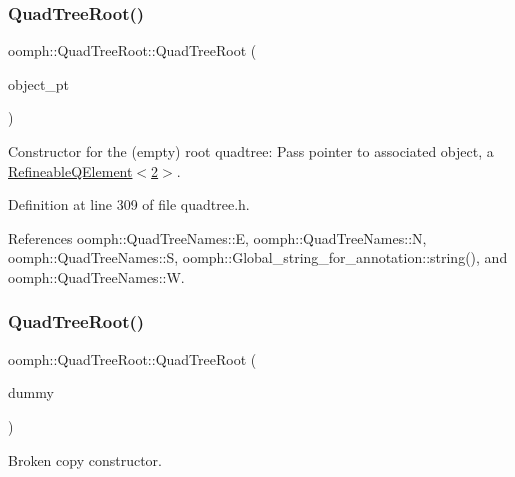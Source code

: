 \subsubsection{\texorpdfstring{Quad\+Tree\+Root()}{QuadTreeRoot()}\hspace{0.1cm}{\footnotesize\ttfamily [1/2]}}
{\footnotesize\ttfamily oomph\+::\+Quad\+Tree\+Root\+::\+Quad\+Tree\+Root (\begin{DoxyParamCaption}\item[{\hyperlink{classoomph_1_1RefineableElement}{Refineable\+Element} $\ast$const \&}]{object\+\_\+pt }\end{DoxyParamCaption})\hspace{0.3cm}{\ttfamily [inline]}}

Constructor for the (empty) root quadtree\+: Pass pointer to associated object, a \hyperlink{classoomph_1_1RefineableQElement_3_012_01_4}{Refineable\+Q\+Element$<$2$>$}. 

Definition at line 309 of file quadtree.\+h.



References oomph\+::\+Quad\+Tree\+Names\+::E, oomph\+::\+Quad\+Tree\+Names\+::N, oomph\+::\+Quad\+Tree\+Names\+::S, oomph\+::\+Global\+\_\+string\+\_\+for\+\_\+annotation\+::string(), and oomph\+::\+Quad\+Tree\+Names\+::W.

\mbox{\label{classoomph_1_1QuadTreeRoot_aa808ed64cac1a2e07229dbc27523555e}} 
\subsubsection{\texorpdfstring{Quad\+Tree\+Root()}{QuadTreeRoot()}\hspace{0.1cm}{\footnotesize\ttfamily [2/2]}}
{\footnotesize\ttfamily oomph\+::\+Quad\+Tree\+Root\+::\+Quad\+Tree\+Root (\begin{DoxyParamCaption}\item[{const \hyperlink{classoomph_1_1QuadTreeRoot}{Quad\+Tree\+Root} \&}]{dummy }\end{DoxyParamCaption})\hspace{0.3cm}{\ttfamily [inline]}}



Broken copy constructor. 



